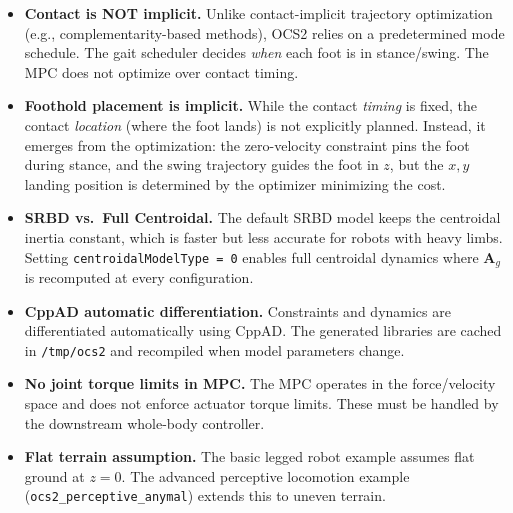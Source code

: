 \documentclass[11pt,a4paper]{article}
\begin{document}
\begin{itemize}
	\item \textbf{Contact is NOT implicit.} Unlike contact-implicit trajectory optimization (e.g., complementarity-based methods), OCS2 relies on a predetermined mode schedule. The gait scheduler decides \emph{when} each foot is in stance/swing. The MPC does not optimize over contact timing.

	\item \textbf{Foothold placement is implicit.} While the contact \emph{timing} is fixed, the contact \emph{location} (where the foot lands) is not explicitly planned. Instead, it emerges from the optimization: the zero-velocity constraint pins the foot during stance, and the swing trajectory guides the foot in $z$, but the $x, y$ landing position is determined by the optimizer minimizing the cost.

	\item \textbf{SRBD vs.\ Full Centroidal.} The default SRBD model keeps the centroidal inertia constant, which is faster but less accurate for robots with heavy limbs. Setting \texttt{centroidalModelType = 0} enables full centroidal dynamics where $\bm{A}_g$ is recomputed at every configuration.

	\item \textbf{CppAD automatic differentiation.} Constraints and dynamics are differentiated automatically using CppAD. The generated libraries are cached in \texttt{/tmp/ocs2} and recompiled when model parameters change.

	\item \textbf{No joint torque limits in MPC.} The MPC operates in the force/velocity space and does not enforce actuator torque limits. These must be handled by the downstream whole-body controller.

	\item \textbf{Flat terrain assumption.} The basic legged robot example assumes flat ground at $z = 0$. The advanced perceptive locomotion example (\texttt{ocs2\_perceptive\_anymal}) extends this to uneven terrain.
\end{itemize}
\end{document}
